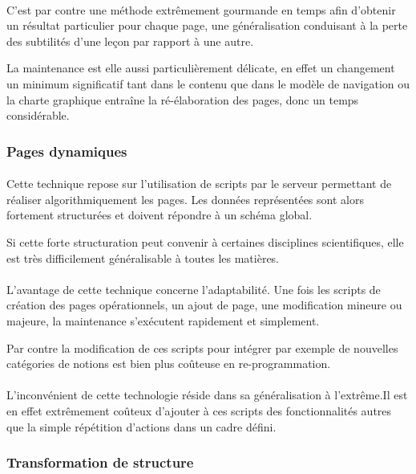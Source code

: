 \paragraph{}C'est par contre une méthode extrêmement gourmande en temps afin d'obtenir un résultat particulier pour chaque page, une généralisation conduisant à la perte des subtilités d'une leçon par rapport à une autre. 

La maintenance est elle aussi particulièrement délicate, en effet un changement un minimum significatif tant dans le contenu que dans le modèle de navigation ou la charte graphique entraîne la ré-élaboration des pages, donc un temps considérable. 

\subsubsection{Pages dynamiques}
\paragraph{}Cette technique repose sur l'utilisation de scripts par le serveur permettant de réaliser algorithmiquement les pages. Les données représentées sont alors fortement structurées et doivent répondre à un schéma global. 

Si cette forte structuration peut convenir à certaines disciplines scientifiques, elle est très difficilement généralisable à toutes les matières.

\paragraph{}L'avantage de cette technique concerne l'adaptabilité. Une fois les scripts de création des pages opérationnels, un ajout de page, une modification mineure ou majeure, la maintenance s'exécutent rapidement et simplement. 

Par contre la modification de ces scripts pour intégrer par exemple de nouvelles catégories de notions est bien plus coûteuse en re-programmation.

\paragraph{}L'inconvénient de cette technologie réside dans sa généralisation à l'extrême.Il est en effet extrêmement coûteux d'ajouter à ces scripts des fonctionnalités autres que la simple répétition d'actions dans un cadre défini.

\subsubsection{Transformation de structure}
